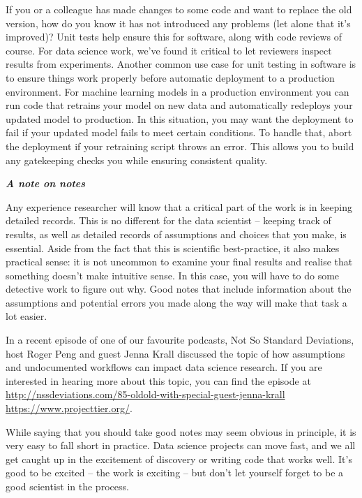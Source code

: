 \documentclass[
]{book}
\begin{document}
If you or a colleague has made changes to some code and want to replace the old version, how do you know it has not introduced any problems (let alone that it's improved)? Unit tests help ensure this for software, along with code reviews of course. For data science work, we've found it critical to let reviewers inspect results from experiments.
Another common use case for unit testing in software is to ensure things work properly before automatic deployment to a production environment.
For machine learning models in a production environment you can run code that retrains your model on new data and automatically redeploys your updated model to production. In this situation, you may want the deployment to fail if your updated model fails to meet certain conditions. To handle that, abort the deployment if your retraining script throws an error. This allows you to build any gatekeeping checks you while ensuring consistent quality.

\begin{infobox}

\textbf{\emph{A note on notes}}

Any experience researcher will know that a critical part of the work is in keeping detailed records. This is no different for the data scientist -- keeping track of results, as well as detailed records of assumptions and choices that you make, is essential. Aside from the fact that this is scientific best-practice, it also makes practical sense: it is not uncommon to examine your final results and realise that something doesn't make intuitive sense. In this case, you will have to do some detective work to figure out why. Good notes that include information about the assumptions and potential errors you made along the way will make that task a lot easier.

In a recent episode of one of our favourite podcasts, Not So Standard Deviations, host Roger Peng and guest Jenna Krall discussed the topic of how assumptions and undocumented workflows can impact data science research. If you are interested in hearing more about this topic, you can find the episode at \url{http://nssdeviations.com/85-oldold-with-special-guest-jenna-krall}
\url{https://www.projecttier.org/}.

While saying that you should take good notes may seem obvious in principle, it is very easy to fall short in practice. Data science projects can move fast, and we all get caught up in the excitement of discovery or writing code that works well. It's good to be excited -- the work is exciting -- but don't let yourself forget to be a good scientist in the process.

\end{infobox}
\end{document}
